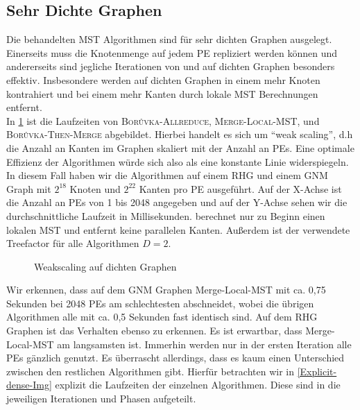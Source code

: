 \subsection{Sehr Dichte Graphen}\label{dense}
Die behandelten MST Algorithmen sind für sehr dichten Graphen ausgelegt. Einerseits muss die Knotenmenge auf jedem PE repliziert werden können und andererseits sind jegliche Iterationen von \boruvkaAllreduce und \mergeMST auf dichten Graphen besonders effektiv. Insbesondere werden auf dichten Graphen in einem \boruvkaStep mehr Knoten kontrahiert und bei einem \mergeStep mehr Kanten durch lokale MST Berechnungen entfernt.\\
In \cref{WeakSkale-dense-Img} ist die Laufzeiten von \textsc{Bor{\r u}vka-Allreduce}, \textsc{Merge-Local-MST}, \boruvkaMixedMerge und \textsc{Bor{\r u}vka-Then-Merge} abgebildet. Hierbei handelt es sich um \enquote{weak scaling}, d.h die Anzahl an Kanten im Graphen skaliert mit der Anzahl an PEs. Eine optimale Effizienz der Algorithmen würde sich also als eine konstante Linie widerspiegeln. In diesem Fall haben wir die Algorithmen auf einem RHG und einem GNM Graph mit $2^{18}$ Knoten und $2^{22}$ Kanten pro PE ausgeführt. Auf der X-Achse ist die Anzahl an PEs von 1 bis 2048 angegeben und auf der Y-Achse sehen wir die durchschnittliche Laufzeit in Millisekunden. \boruvkaAllreduce berechnet nur zu Beginn einen lokalen MST und entfernt keine parallelen Kanten. Außerdem ist der verwendete Treefactor für alle Algorithmen $D=2$.

\begin{figure}[H]
    \centering
    
    
    \caption{Weakscaling auf dichten Graphen}
    \label{WeakSkale-dense-Img}
\end{figure}

Wir erkennen, dass auf dem GNM Graphen Merge-Local-MST mit ca. 0,75 Sekunden bei 2048 PEs am schlechtesten abschneidet, wobei die übrigen Algorithmen alle mit ca. 0,5 Sekunden fast identisch sind. Auf dem RHG Graphen ist das Verhalten ebenso zu erkennen.
Es ist erwartbar, dass Merge-Local-MST am langsamsten ist. Immerhin werden nur in der ersten Iteration alle PEs gänzlich genutzt. Es überrascht allerdings, dass es kaum einen Unterschied zwischen den restlichen Algorithmen gibt. Hierfür betrachten wir in \cref{Explicit-dense-Img} explizit die Laufzeiten der einzelnen Algorithmen. Diese sind in die jeweiligen Iterationen und Phasen aufgeteilt.



